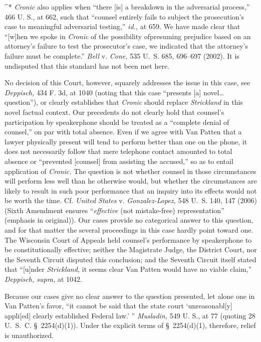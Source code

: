 ^* \emph{Cronic} also applies when ``there [is] a breakdown in the adversarial process,'' 466 U. S., at 662, such that ``counsel entirely fails to subject the prosecution's case to meaningful adversarial testing,'' \emph{id.,} at 659. We have made clear that ``[w]hen we spoke in \emph{Cronic} of the possibility of\newpage presuming prejudice based on an attorney's failure to test the prosecutor's case, we indicated that the attorney's failure must be complete.'' \emph{Bell} v. \emph{Cone,} 535 U.~S. 685, 696--697 (2002). It is undisputed that this standard has not been met here.

  No decision of this Court, however, squarely addresses the issue in this case, see \emph{Deppisch,} 434 F. 3d, at 1040 (noting that this case ``presents [a] novel\dots question''), or clearly establishes that \emph{Cronic} should replace \emph{Strickland} in this novel factual context. Our precedents do not clearly hold that counsel's participation by speakerphone should be treated as a ``complete denial of counsel,'' on par with total absence. Even if we agree with Van Patten that a lawyer physically present will tend to perform better than one on the phone, it does not necessarily follow that mere telephone contact amounted to total absence or ``prevented [counsel] from assisting the accused,'' so as to entail application of \emph{Cronic.} The question is not whether counsel in those circumstances will perform less well than he otherwise would, but whether the circumstances are likely to result in such poor performance that an inquiry into its effects would not be worth the time. Cf. \emph{United States} v. \emph{Gonzalez-Lopez,} 548 U.~S. 140, 147 (2006) (Sixth Amendment ensures ``\emph{effective} (not mistake-free) representation'' (emphasis in original)). Our cases provide no categorical answer to this question, and for that matter the several proceedings in this case hardly point toward one. The Wisconsin Court of Appeals held counsel's performance by speakerphone to be constitutionally effective; neither the Magistrate Judge, the District Court, nor the Seventh Circuit disputed this conclusion; and the Seventh Circuit itself stated that ``[u]nder \emph{Strickland,} it seems clear Van Patten would have no viable claim,'' \emph{Deppisch, supra,} at 1042.

  \newpage Because our cases give no clear answer to the question presented, let alone one in Van Patten's favor, ``it cannot be said that the state court ‘unreasonabl[y] appli[ed] clearly established Federal law.' '' \emph{Musladin,} 549 U. S., at 77 (quoting 28 U.~S.~C. \S~2254(d)(1)). Under the explicit terms of \S~2254(d)(1), therefore, relief is unauthorized.

